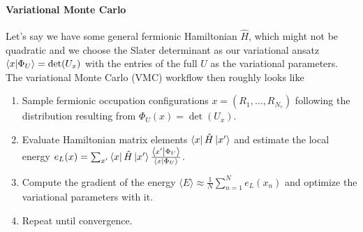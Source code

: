 \documentclass[../../main.tex]{subfiles}
\begin{document}
\paragraph{Variational Monte Carlo}
Let's say we have some general fermionic Hamiltonian $\hat H$, which might not be quadratic and we choose the Slater determinant as our variational ansatz $\left\langle x \middle| \Phi_U \right\rangle = \det(U_x)$ with the entries of the full $U$ as the variational parameters. The variational Monte Carlo (VMC) workflow then roughly looks like
\begin{enumerate}
    \item Sample fermionic occupation configurations $x = (R_1, \ldots, R_{N_e})$ following the distribution resulting from $\Phi_U(x) = \det(U_x)$.
    \item Evaluate Hamiltonian matrix elements $\left\langle x \right\rvert \hat H \left\lvert x' \right\rangle$ and estimate the local energy $e_L(x) = \sum_{x'} \left\langle x \right\rvert \hat H \left\lvert x' \right\rangle \frac{\left\langle x' \middle| \Phi_U \right\rangle}{\left\langle x \middle| \Phi_U \right\rangle}$.
    \item Compute the gradient of the energy $\langle E \rangle \approx \frac{1}{N} \sum_{n=1}^N e_L(x_n)$ and optimize the variational parameters with it.
    \item Repeat until convergence.
\end{enumerate}
\end{document}
